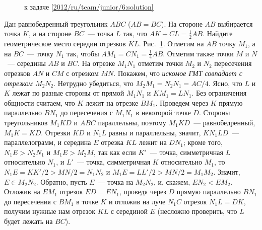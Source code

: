\ifsolution
\begin{figure}\centering
    \caption{к задаче \ref{2012/ru/team/junior/6:solution}}
    \label{2012/ru/team/junior/6:solution:fig}
\end{figure}%
\fi %

\problem{}
Дан равнобедренный треугольник $ABC$ ($AB = BC$).
На стороне $AB$ выбирается точка $K$, а на стороне $BC$~--- точка $L$ так, что
$AK + CL = \frac{1}{2} AB$.
Найдите геометрическое место середин отрезков $KL$.
\solution
\label{2012/ru/team/junior/6:solution}%
Рис.~\ref{2012/ru/team/junior/6:solution:fig}.
Отметим на $AB$ точку $M_1$, а на $BC$~--- точку $N_1$ так, чтобы
$A M_1 = C N_1 = \frac{1}{4} AB$.
Отметим также точки $M$ и $N$~--- середины $AB$ и $BC$.
На отрезке $M_1 N_1$ отметим точки $M_2$ и $N_2$ пересечения отрезков
$A N$ и $C M$ с отрезком $MN$.
Покажем, что \emph{искомое ГМТ совпадает с отрезком $M_2 N_2$}.
Нетрудно убедиться, что $M_2 M_1 = N_2 N_1 = AC / 4$.
Ясно, что $L$ и $K$ лежат по разные стороны от прямой $M_1 N_1$ и
$K M_1 = L N_1$.
Без ограничения общности считаем, что $K$ лежит на отрезке $B M_1$.
Проведем через $K$ прямую параллельно $B N_1$ до пересечения с $M_1 N_1$ в
некоторой точке $D$.
Стороны треугольников $M_1 K D$ и $ABC$ параллельны, поэтому $M_1 K D$~---
равнобедренный, $M_1 K = KD$.
Отрезки $KD$ и $N_1 L$ равны и параллельны, значит, $K N_1 L D$~---
параллелограмм, и середина $E$ отрезка $KL$ лежит на $D N_1$;
кроме того, $N_1 E > N_2 N_1$ и $M_1 E > M_2 M$, так как если
$K'$~--- точка, симметричная $L$ относительно $N_1$, и
$L'$~--- точка, симметричная $K$ относительно $M_1$, то
$N_1 E = KK' / 2 > MN / 2 = N_1 N_2$ и $M_1 E = LL' / 2 > M N / 2 = M_1 M_2$.
Значит, $E \in M_2 N_2$.
Обратно, пусть $E$~--- точка на $M_2 N_2$, и, скажем, $E N_2 < E M_2$.
Отложив на $E M_1$ отрезок $ED = E N_1$, проведя через $D$ прямую параллельно
$B N_1$ до пересечения с $B M_1$ в точке $K$ и отложив на луче $N_1 C$ отрезок
$N_1 L = DK$, получим нужные нам отрезок $KL$ с серединой $E$
(несложно проверить, что $L$ будет лежать на $BC$).
\endproblem
